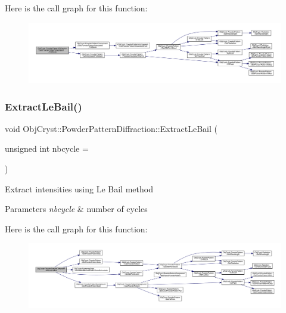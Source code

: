 Here is the call graph for this function\+:
\nopagebreak
\begin{figure}[H]
\begin{center}
\leavevmode
\includegraphics[width=350pt]{class_obj_cryst_1_1_powder_pattern_diffraction_a47a3a1e09d0ab4c4f092384650db3efd_cgraph}
\end{center}
\end{figure}
\mbox{\label{class_obj_cryst_1_1_powder_pattern_diffraction_aa86150b55c39275e7d076afb2b43513d}} 
\subsubsection{\texorpdfstring{ExtractLeBail()}{ExtractLeBail()}}
{\footnotesize\ttfamily void Obj\+Cryst\+::\+Powder\+Pattern\+Diffraction\+::\+Extract\+Le\+Bail (\begin{DoxyParamCaption}\item[{unsigned int}]{nbcycle = {} }\end{DoxyParamCaption})}

Extract intensities using Le Bail method


\begin{DoxyParams}{Parameters}
{\em nbcycle} & number of cycles \\
\hline
\end{DoxyParams}
Here is the call graph for this function\+:
\nopagebreak
\begin{figure}[H]
\begin{center}
\leavevmode
\includegraphics[width=350pt]{class_obj_cryst_1_1_powder_pattern_diffraction_aa86150b55c39275e7d076afb2b43513d_cgraph}
\end{center}
\end{figure}
\mbox{\label{class_obj_cryst_1_1_powder_pattern_diffraction_a4476a792c880de38169424f96f482fd9}} 
